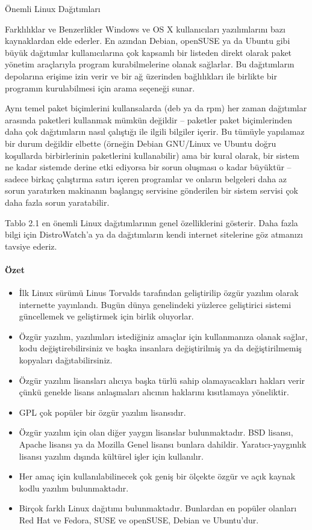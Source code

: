\begin{section}{Önemli Linux Dağıtımları}
\begin{subsection}{Farklılıklar ve Benzerlikler}
Windows ve OS X kullanıcıları yazılımlarını bazı kaynaklardan elde ederler. En azından Debian, openSUSE ya da Ubuntu gibi büyük dağıtımlar kullanıcılarına çok kapsamlı bir listeden direkt olarak paket yönetim araçlarıyla program kurabilmelerine olanak sağlarlar. Bu dağıtımların depolarına erişime izin verir ve bir ağ üzerinden bağlılıkları ile birlikte bir programın kurulabilmesi için arama seçeneği sunar.

Aynı temel paket biçimlerini kullansalarda (deb ya da rpm) her zaman dağıtımlar arasında paketleri kullanmak mümkün değildir – paketler paket biçimlerinden daha çok dağıtımların nasıl çalıştığı ile ilgili bilgiler içerir. Bu tümüyle yapılamaz bir durum değildir elbette (örneğin Debian GNU/Linux ve Ubuntu doğru koşullarda birbirlerinin paketlerini kullanabilir) ama bir kural olarak, bir sistem ne kadar sistemde derine etki ediyorsa bir sorun oluşması o kadar büyüktür – sadece birkaç çalıştırma satırı içeren programlar ve onların belgeleri daha az sorun yaratırken makinanın başlangıç servisine gönderilen bir sistem servisi çok daha fazla sorun yaratabilir.

Tablo 2.1 en önemli Linux dağıtımlarının genel özelliklerini gösterir. Daha fazla bilgi için DistroWatch'a ya da dağıtımların kendi internet sitelerine göz atmanızı tavsiye ederiz.
\paragraph{Özet}{
\begin{itemize}
 \item İlk Linux sürümü Linus Torvalds tarafından geliştirilip özgür yazılım olarak internette yayınlandı. Bugün dünya genelindeki yüzlerce geliştirici sistemi güncellemek ve geliştirmek için birlik oluyorlar.
 \item Özgür yazılım, yazılımları istediğiniz amaçlar için kullanmanıza olanak sağlar, kodu değiştirebilirsiniz ve başka insanlara değiştirilmiş ya da değiştirilmemiş kopyaları dağıtabilirsiniz.
 \item Özgür yazılım lisansları alıcıya başka türlü sahip olamayacakları hakları verir çünkü genelde lisans anlaşmaları alıcının haklarını kısıtlamaya yöneliktir.
 \item GPL çok popüler bir özgür yazılım lisansıdır.
 \item Özgür yazılım için olan diğer yaygın lisanslar bulunmaktadır. BSD lisansı, Apache lisansı ya da Mozilla Genel lisansı bunlara dahildir. Yaratıcı-yaygınlık lisansı yazılım dışında kültürel işler için kullanılır.
 \item Her amaç için kullanılabilinecek çok geniş bir ölçekte özgür ve açık kaynak kodlu yazılım bulunmaktadır.
 \item Birçok farklı Linux dağıtımı bulunmaktadır. Bunlardan en popüler olanları Red Hat ve Fedora, SUSE ve openSUSE, Debian ve Ubuntu'dur.
\end{itemize}}
\end{subsection}
\end{section}
